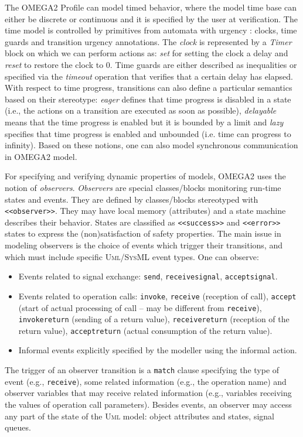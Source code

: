\documentclass[a4paper,twoside]{article}
\def\sysml{\textsc{SysML}}
\def\uml{\textsc{Uml}}
\begin{document}
The OMEGA2 Profile can model timed behavior, where the model time base can either be discrete or continuous and it is specified by the user at verification. The time model is controlled by primitives from automata with urgency \cite{SBornot2000}: clocks, time guards and transition urgency annotations. The \textit{clock} is represented by a \textit{Timer} block on which we can perform actions as: \textit{set} for setting the clock a delay and \textit{reset} to restore the clock to 0. Time guards are either described as inequalities or specified via the \textit{timeout} operation  that verifies that a certain delay has elapsed. With respect to time progress, transitions can also define a particular semantics based on their stereotype: \textit{eager} defines that time progress is disabled in a state (i.e., the actions on a transition are executed as soon as possible), \textit{delayable} means that the time progress is enabled but it is bounded by a limit and \textit{lazy} specifies that time progress is enabled and unbounded (i.e. time can progress to infinity). Based on these notions, one can also model synchronous communication in OMEGA2 model.

For specifying and verifying dynamic properties of models, OMEGA2 uses the notion of \textit{observers}. \textit{Observers} are special classes/blocks monitoring run-time states and events. They are defined by classes/blocks stereotyped with \texttt{<<observer>>}. They may have local memory (attributes) and a state machine describes their behavior. States are classified as \texttt{<<success>>} and \texttt{<<error>>} states to express the (non)satisfaction of safety properties. The main issue in modeling observers is the choice of events which trigger their transitions, and which must include specific \uml{}/\sysml{} event types. One can observe:

\begin{itemize}
\item Events related to signal exchange: \texttt{send}, \texttt{receivesignal}, \texttt{acceptsignal}.
\item Events related to operation calls: \texttt{invoke}, \texttt{receive} (reception of call), \texttt{accept} (start of actual processing of call -- may be different from \texttt{receive}), \texttt{invokereturn} (sending of a 
return 	value), \texttt{receivereturn} (reception of the return value), \texttt{acceptreturn} (actual consumption of the return value).
\item Informal events explicitly specified by the modeller using the informal action.
\end{itemize}
The trigger of an observer transition is a \texttt{match} clause specifying the type of event (e.g., \texttt{receive}), some related information (e.g., the operation name) and observer variables that may receive related information (e.g., variables receiving the values of operation call parameters). Besides events, an observer may access any part of the state of the \uml{} model: object attributes and states, signal queues. 
\end{document}
